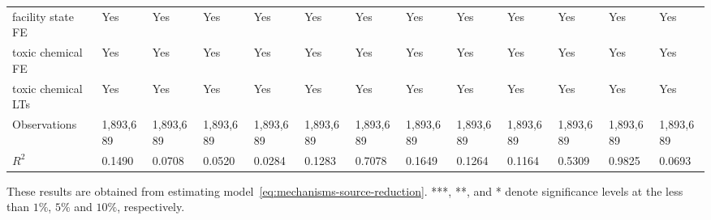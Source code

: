 \begin{table}[H]
{\begin{tabular}{@{}lllllllllllll@{}}
            facility state FE  & Yes        & Yes                 & Yes                    & Yes             & Yes          & Yes        & Yes       & Yes       & Yes           & Yes           & Yes              & Yes       \\
            toxic chemical FE  & Yes        & Yes                 & Yes                    & Yes             & Yes          & Yes        & Yes       & Yes       & Yes           & Yes           & Yes              & Yes       \\
            toxic chemical LTs & Yes        & Yes                 & Yes                    & Yes             & Yes          & Yes        & Yes       & Yes       & Yes           & Yes           & Yes              & Yes       \\\midrule\midrule
            Observations       & 1,893,689  & 1,893,689           & 1,893,689              & 1,893,689       & 1,893,689    & 1,893,689  & 1,893,689 & 1,893,689 & 1,893,689     & 1,893,689  & 1,893,689  & 1,893,689 \\
            $R^2$              & 0.1490     & 0.0708              & 0.0520                 & 0.0284          & 0.1283       & 0.7078     & 0.1649    & 0.1264    & 0.1164        & 0.5309        & 0.9825  & 0.0693    \\ \bottomrule\bottomrule
        \end{tabular}%
    }
    \begin{minipage}{18cm}
        \vspace{0.05in}
        These results are obtained from estimating model~\ref{eq:mechanisms-source-reduction}. ***, **, and * denote significance levels at the less than $1\%$, $5\%$ and $10\%$, respectively.
    \end{minipage}
\end{table}